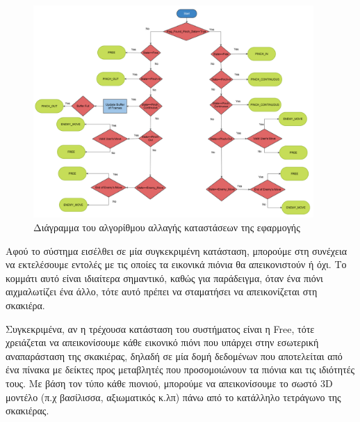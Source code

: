 \begin{figure}[H]
    \centering
    \includegraphics[width=0.95\textwidth]{Files/Figures/change_of_states.pdf}
    \caption[Διάγραμμα του αλγορίθμου αλλαγής καταστάσεων της εφαρμογής]{Διάγραμμα του αλγορίθμου αλλαγής καταστάσεων της εφαρμογής}
    \label{fig:states}
\end{figure}






Αφού το σύστημα εισέλθει σε μία συγκεκριμένη κατάσταση, μπορούμε στη συνέχεια να εκτελέσουμε εντολές με τις οποίες τα εικονικά πιόνια θα απεικονιστούν ή όχι. Το κομμάτι αυτό είναι ιδιαίτερα σημαντικό, καθώς για παράδειγμα, όταν ένα πιόνι αιχμαλωτίζει ένα άλλο, τότε αυτό πρέπει να σταματήσει να απεικονίζεται στη σκακιέρα.


Συγκεκριμένα, αν η τρέχουσα κατάσταση του συστήματος είναι η Free, τότε χρειάζεται να απεικονίσουμε κάθε εικονικό πιόνι που υπάρχει στην εσωτερική αναπαράσταση της σκακιέρας, δηλαδή σε μία δομή δεδομένων που αποτελείται από ένα πίνακα με δείκτες προς μεταβλητές που προσομοιώνουν τα πιόνια και τις ιδιότητές τους. Με βάση τον τύπο κάθε πιονιού, μπορούμε να απεικονίσουμε το σωστό 3D μοντέλο (π.χ βασίλισσα, αξιωματικός κ.λπ) πάνω από το κατάλληλο τετράγωνο της σκακιέρας. 


